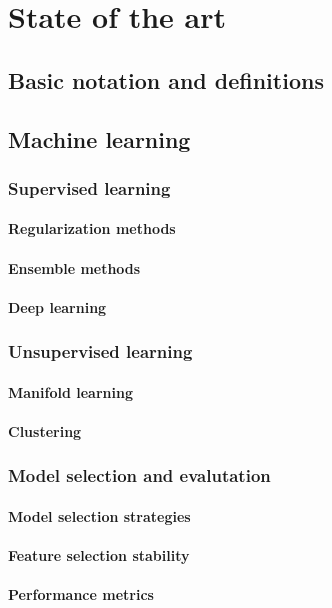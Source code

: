\chapter{State of the art} \label{chap:state-of-the-art}

\section{Basic notation and definitions} \label{sec:notation}
\section{Machine learning} \label{sec:machine_learning}
  \subsection{Supervised learning} \label{subsec:supervised_learning}
    \subsubsection{Regularization methods}
    \subsubsection{Ensemble methods}
    \subsubsection{Deep learning}


  \subsection{Unsupervised learning} \label{subsec:unsupervised_learning}
    \subsubsection{Manifold learning}
    \subsubsection{Clustering}


  \subsection{Model selection and evalutation} \label{subsec:model_selection}
    \subsubsection{Model selection strategies}
    \subsubsection{Feature selection stability}
    \subsubsection{Performance metrics}
